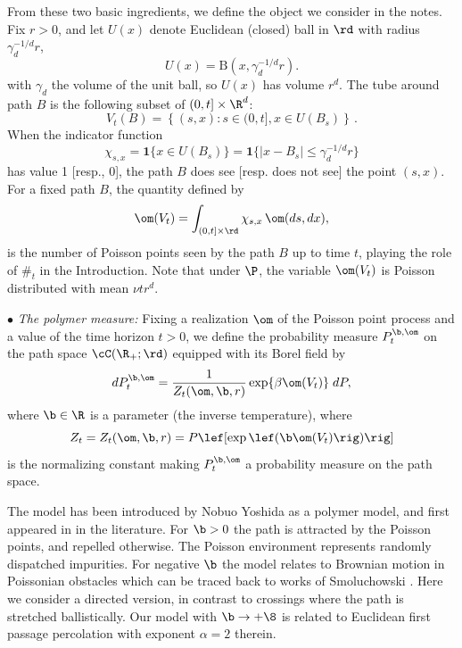From these two basic ingredients, we define the object we consider in the notes. Fix $r>0$, and let $U(x)$ denote Euclidean (closed) ball in $\rd$ with radius $\gamma_d^{-1/d} r$,
$$
U(x)= {\mathrm B}  (x , \gamma_d^{-1/d} r).
$$ with $\gamma_d$ the volume of the unit ball, so $U(x)$ has volume $r^d$.  The tube around path $B$ is the following subset of $(0,t]\times\R^d$: 
\begin{equation}
V_t(B)= \left\{ (s,x): s \in (0,t], x \in U(B_s)\right\}\,.
\end{equation}
When the indicator function
 \begin{equation} \label{def:chitx}
\chi_{s,x}= {\mathbf 1} \{x \in U(B_s) \} = {\mathbf 1} \{|x-B_s| \leq \gamma_d^{-1/d} r\}
\end{equation}
has value 1 [resp., 0],  the path $B$ does see [resp. does not see] the point $(s,x)$. For a fixed path $B$, the quantity defined by
\begin{equation} \label{eq:214}
\om (V_t) = \int_{(0,t] \times \rd} \chi_{s,x} \, \om(ds,dx),
\end{equation}
is the number of Poisson points seen by the path $B$ up to time $t$, playing the role of $\#_t$ in the Introduction. Note that under $\P$, the variable $\om (V_t)$ is Poisson distributed with mean $\nu t r^d$.


$\bullet$ {\it The polymer measure:} Fixing a realization $\om$ of the Poisson point process and a value of the time horizon
$t>0$, we define the probability measure $\gibbs$ on the path space 
${\cC}(\R_+; \rd)$ equipped with its Borel field by  
\begin{equation} \label{mnen}
d \gibbs =\frac{1}{Z_{t}(\om,\b,r)}
\exp \{\beta \om(V_t)\} \;dP,
\end{equation}
where $\b \in \R$ is a parameter (the inverse temperature), where 
\begin{equation} \label{Zt}
Z_t=Z_{t}(\om,\b,r)
=P\lef[\exp \lef(\b \om(V_t)
\rig) \rig]
\end{equation}
is the normalizing constant making $\gibbs$ a probability measure on the path space.
%

 The model has been introduced by Nobuo Yoshida as a polymer model, and first appeared in \cite{CY05} in the literature.  For $\b >0$ the path is attracted by the Poisson points, and repelled otherwise. The Poisson environment represents randomly dispatched impurities. 
For negative $\b$ the model relates to Brownian motion in Poissonian obstacles
\cite{donskervaradhan-wienersaus, Sznitman} which can be traced back to works of Smoluchowski \cite{Smoluchowski}. Here we consider  a directed version, in contrast to crossings \cite{Wuthrich1, Wuthrich2, Wuthrich-geodesics, Wuthrich-bornes} where the path is stretched ballistically.
Our model with $\b \to +\8$ is related to Euclidean first passage percolation \cite{HowardNewman97, Howard00} with exponent $\alpha=2$ therein.

